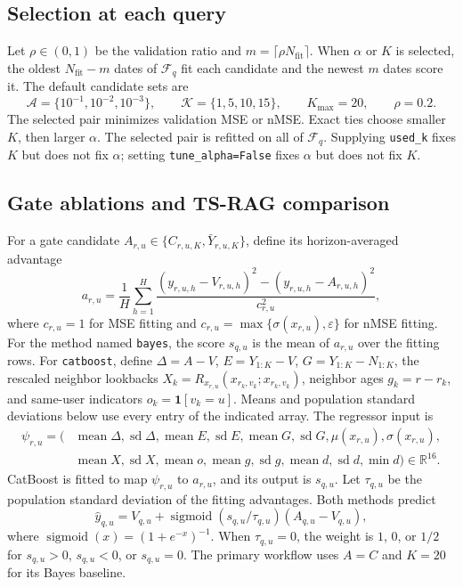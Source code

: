\documentclass[11pt]{article}
\newcommand{\Nfit}{N_{\mathrm{fit}}}
\newcommand{\Kmax}{K_{\max}}
\newcommand{\eps}{\varepsilon}
\begin{document}
\subsection{Selection at each query}

Let $\rho\in(0,1)$ be the validation ratio and
$m=\lceil\rho\Nfit\rceil$. When $\alpha$ or $K$ is selected, the oldest
$\Nfit-m$ dates of $\mathcal F_q$ fit each candidate and the newest $m$ dates
score it. The default candidate sets are
\[
 \mathcal A=\{10^{-1},10^{-2},10^{-3}\},\qquad
 \mathcal K=\{1,5,10,15\},\qquad \Kmax=20,\qquad \rho=0.2. \tag{14}
\]
The selected pair minimizes validation MSE or nMSE. Exact ties choose smaller
$K$, then larger $\alpha$. The selected pair is refitted on all of
$\mathcal F_q$. Supplying \texttt{used\_k} fixes $K$ but does not fix
$\alpha$; setting \texttt{tune\_alpha=False} fixes $\alpha$ but does not fix
$K$.

\subsection{Gate ablations and TS-RAG comparison}

For a gate candidate $A_{r,u}\in\{C_{r,u,K},\bar Y_{r,u,K}\}$, define its
horizon-averaged advantage
\[
 a_{r,u}=\frac1H\sum_{h=1}^H
 \frac{(y_{r,u,h}-V_{r,u,h})^2-(y_{r,u,h}-A_{r,u,h})^2}
 {c_{r,u}^2},                                                 \tag{15}
\]
where $c_{r,u}=1$ for MSE fitting and
$c_{r,u}=\max\{\sigma(x_{r,u}),\eps\}$ for nMSE fitting. For the method named
\texttt{bayes}, the score $s_{q,u}$ is the mean of $a_{r,u}$ over the fitting
rows. For \texttt{catboost}, define $\Delta=A-V$,
$E=Y_{1:K}-V$, $G=Y_{1:K}-N_{1:K}$, the rescaled neighbor lookbacks
$X_k=R_{x_{r,u}}(x_{r_k,v_k};x_{r_k,v_k})$, neighbor ages
$g_k=r-r_k$, and same-user indicators $o_k=\mathbf 1[v_k=u]$. Means and
population standard deviations below use every entry of the indicated array.
The regressor input is
\begin{align*}
 \psi_{r,u}=(&\operatorname{mean}\Delta,\operatorname{sd}\Delta,
 \operatorname{mean}E,\operatorname{sd}E,
 \operatorname{mean}G,\operatorname{sd}G,
 \mu(x_{r,u}),\sigma(x_{r,u}),\\
 &\operatorname{mean}X,\operatorname{sd}X,
 \operatorname{mean}o,\operatorname{mean}g,\operatorname{sd}g,
 \operatorname{mean}d,\operatorname{sd}d,\min d)\in\mathbb R^{16}. \tag{16}
\end{align*}
CatBoost is fitted to map $\psi_{r,u}$ to $a_{r,u}$, and its output is
$s_{q,u}$. Let
$\tau_{q,u}$ be the population standard deviation of the fitting advantages.
Both methods predict
\[
 \widehat y_{q,u}=V_{q,u}+
 \operatorname{sigmoid}(s_{q,u}/\tau_{q,u})(A_{q,u}-V_{q,u}),\tag{17}
\]
where $\operatorname{sigmoid}(x)=(1+e^{-x})^{-1}$. When $\tau_{q,u}=0$, the
weight is $1$, $0$, or $1/2$ for $s_{q,u}>0$, $s_{q,u}<0$, or $s_{q,u}=0$.
The primary workflow uses $A=C$ and $K=20$ for its Bayes baseline.
\end{document}

